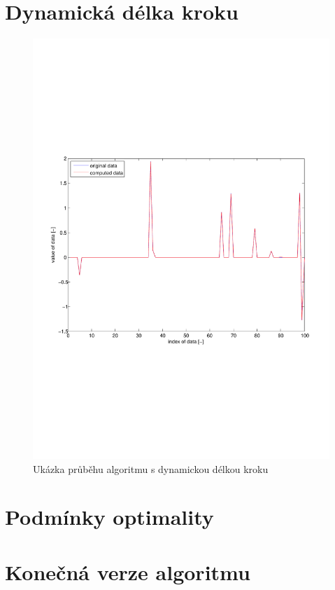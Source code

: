 \documentclass[FM,BP]{tulthesis}
\begin{document}
\section{Dynamická délka kroku}
\begin{figure}[!ht]
\begin{center}
\includegraphics[scale=0.5]{obr/dynamic.pdf}
\end{center}
\caption{Ukázka průběhu algoritmu s dynamickou délkou kroku}
\label{fig:dynamicAlpha}
\end{figure}

\section{Podmínky optimality}

\section{Konečná verze algoritmu}
\end{document}
